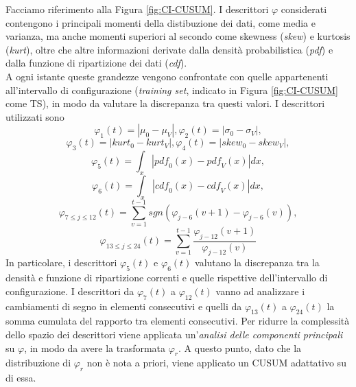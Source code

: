 Facciamo riferimento alla Figura \ref{fig:CI-CUSUM}. I descrittori $\varphi$ considerati contengono i principali momenti della distibuzione dei dati, come media e varianza, ma anche momenti superiori al secondo come skewness (\textit{skew}) e kurtosis (\textit{kurt}), oltre che altre informazioni derivate dalla densit\`a probabilistica (\textit{pdf}) e dalla funzione di ripartizione dei dati (\textit{cdf}).\\
A ogni istante queste grandezze
vengono confrontate con quelle
appartenenti all'intervallo di
configurazione (\textit{training set},
indicato in Figura \ref{fig:CI-CUSUM}
come TS), in modo da valutare la
discrepanza tra questi valori. I
descrittori utilizzati sono
\[
\varphi_1(t)=|\mu_0-\mu_V|,\varphi_2(t)=|\sigma_0-\sigma_V|,\]
\[\varphi_3(t)=|\textit{kurt}_0-\textit{kurt}_V|,\varphi_4(t)=|\textit{skew}_0-\textit{skew}_V|, \]
\[\varphi_5(t)=\int_x|\textit{pdf}_0(x)-\textit{pdf}_V(x)|\textit{dx},\]
\[\varphi_6(t)=\int_x|\textit{cdf}_0(x)-\textit{cdf}_V(x)|\textit{dx}, \]
\[ \varphi_{7\leq j\leq 12}(t)=
\sum_{v=1}^{t-1}\textit{sgn}(\varphi_{j-6}(v+1)-\varphi_{j-6}(v)),\]
\[\varphi_{13\leq j\leq 24}(t)=
\sum_{v=1}^{t-1}\frac{\varphi_{j-12}(v+1)}{\varphi_{j-12}(v)} \]
In particolare, i descrittori
$\varphi_5(t)$ e $\varphi_6(t)$
valutano la discrepanza tra la
densit\`a e funzione di ripartizione
correnti e quelle rispettive
dell'intervallo di configurazione. I
descrittori da $\varphi_7(t)$ a
$\varphi_{12}(t)$ vanno ad analizzare
i cambiamenti di segno in elementi
consecutivi e quelli da
$\varphi_{13}(t)$ a $\varphi_{24}(t)$
la somma cumulata del rapporto tra
elementi consecutivi. Per ridurre la
complessit\`a dello spazio dei
descrittori viene applicata
un'\textit{analisi delle componenti
	principali} su $\varphi$, in modo da
avere la trasformata $\varphi_r$. A
questo punto, dato che la
distribuzione di $\varphi_r$ non \`e
nota a priori, viene applicato un
CUSUM adattativo su di essa.
